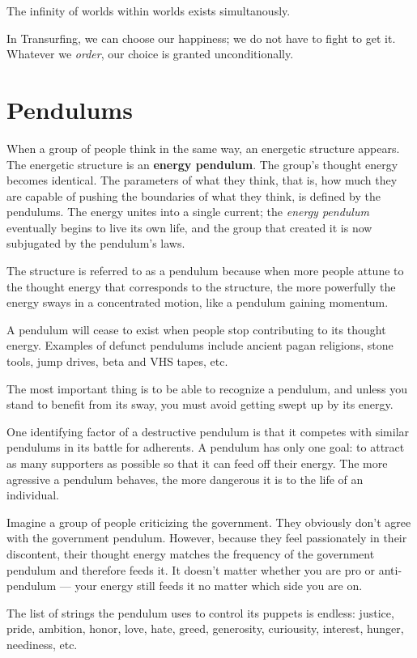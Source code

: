 \documentclass[
  openany]{book}
\begin{document}
The infinity of worlds within worlds exists simultanously.

In Transurfing, we can choose our happiness; we do not have to fight to get it. Whatever we \emph{order}, our choice is granted unconditionally.

\hypertarget{pendulums}{%
\chapter{Pendulums}\label{pendulums}}

When a group of people think in the same way, an energetic structure appears. The energetic structure is an \textbf{energy pendulum}. The group's thought energy becomes identical. The parameters of what they think, that is, how much they are capable of pushing the boundaries of what they think, is defined by the pendulums. The energy unites into a single current; the \emph{energy pendulum} eventually begins to live its own life, and the group that created it is now subjugated by the pendulum's laws.

The structure is referred to as a pendulum because when more people attune to the thought energy that corresponds to the structure, the more powerfully the energy sways in a concentrated motion, like a pendulum gaining momentum.

A pendulum will cease to exist when people stop contributing to its thought energy. Examples of defunct pendulums include ancient pagan religions, stone tools, jump drives, beta and VHS tapes, etc.

The most important thing is to be able to recognize a pendulum, and unless you stand to benefit from its sway, you must avoid getting swept up by its energy.

One identifying factor of a destructive pendulum is that it competes with similar pendulums in its battle for adherents. A pendulum has only one goal: to attract as many supporters as possible so that it can feed off their energy. The more agressive a pendulum behaves, the more dangerous it is to the life of an individual.

Imagine a group of people criticizing the government. They obviously don't agree with the government pendulum. However, because they feel passionately in their discontent, their thought energy matches the frequency of the government pendulum and therefore feeds it. It doesn't matter whether you are pro or anti-pendulum --- your energy still feeds it no matter which side you are on.

The list of strings the pendulum uses to control its puppets is endless: justice, pride, ambition, honor, love, hate, greed, generosity, curiousity, interest, hunger, neediness, etc.
\end{document}

